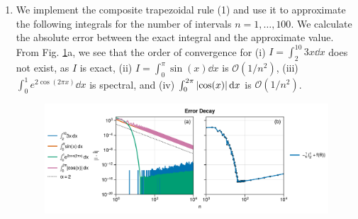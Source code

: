 \begin{enumerate}[label=(\alph*),leftmargin=*,itemsep=0mm]
    \item We implement the composite trapezoidal rule (1) and use it to approximate the following integrals for the number of intervals $n=1,\dots,100$.  We calculate the absolute error between the exact integral and the approximate value.  From Fig. \ref{prj3_qn0bqn1b}a, we see that the order of convergence for (i) $I = \int_2^{10} 3x\dd{x}$ does not exist, as $I$ is exact, (ii) $I = \int_0^{\pi} \sin(x) \dd{x}$ is $\mathcal{O}(1/n^2)$, (iii) $\int_0^1 e^{2\cos(2\pi x)} \dd{x}$ is spectral, and (iv) $\int_0^{2\pi} \abs{\cos(x)} \dd{x}$ is $\mathcal{O}(1/n^2)$.

    \begin{figure}[h!]
    \centering
    \includegraphics[width=\textwidth]{figures/prj3_qn0bqn1b.png}\\
    \caption{}
    \label{prj3_qn0bqn1b}
    \end{figure}
    
\end{enumerate}